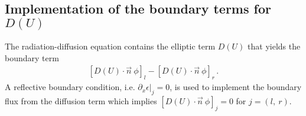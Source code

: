 \subsection{Implementation of the boundary terms for $D(U)$}
%
The radiation-diffusion equation contains the elliptic term $D(U)$ that yields the boundary term 
%
\begin{eqnarray}
\left[D(U)\cdot \vec{n} \ \phi \right]_{l} - \left[D(U)\cdot \vec{n} \ \phi \right]_{r} \, . \nonumber
\end{eqnarray}
%
A reflective boundary condition, i.e. $\left. \partial_x \epsilon \right|_j = 0$, is used to implement the boundary flux from the diffusion term
%
%
which implies $\left[D(U)\cdot \vec{n} \ \phi \right]_{j} = 0$ for $j = \left( l, \ r \right)$.
%
% 
